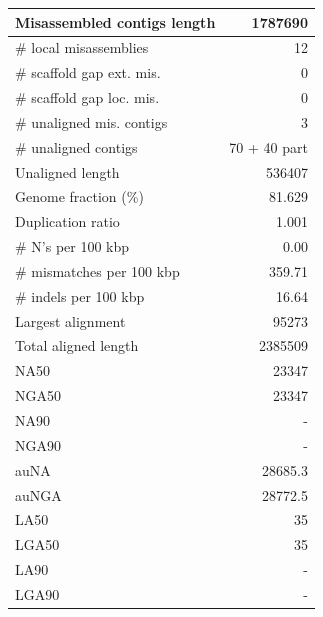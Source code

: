 \documentclass[12pt,a4paper]{article}
\begin{document}
\begin{table}[ht]
\begin{center}
\begin{tabular}{|l*{1}{|r}|}
Misassembled contigs length & 1787690 \\ \hline
\# local misassemblies & 12 \\ \hline
\# scaffold gap ext. mis. & 0 \\ \hline
\# scaffold gap loc. mis. & 0 \\ \hline
\# unaligned mis. contigs & 3 \\ \hline
\# unaligned contigs & 70 + 40 part \\ \hline
Unaligned length & 536407 \\ \hline
Genome fraction (\%) & 81.629 \\ \hline
Duplication ratio & 1.001 \\ \hline
\# N's per 100 kbp & 0.00 \\ \hline
\# mismatches per 100 kbp & 359.71 \\ \hline
\# indels per 100 kbp & 16.64 \\ \hline
Largest alignment & 95273 \\ \hline
Total aligned length & 2385509 \\ \hline
NA50 & 23347 \\ \hline
NGA50 & 23347 \\ \hline
NA90 & - \\ \hline
NGA90 & - \\ \hline
auNA & 28685.3 \\ \hline
auNGA & 28772.5 \\ \hline
LA50 & 35 \\ \hline
LGA50 & 35 \\ \hline
LA90 & - \\ \hline
LGA90 & - \\ \hline
\end{tabular}
\end{center}
\end{table}
\end{document}
